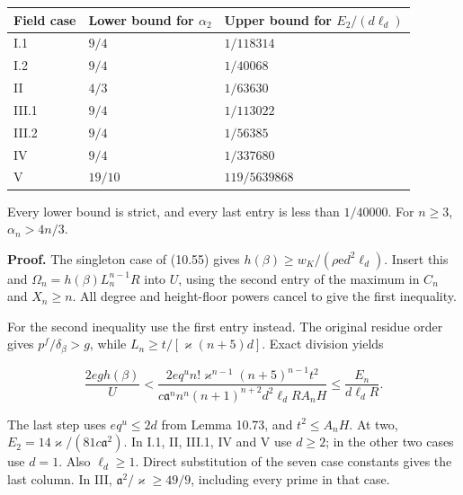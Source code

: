 \documentclass[
  11pt,
  a4paper,
]{article}
\newcounter{none} %
\begin{document}
{\def\LTcaptype{none} %
\begin{longtable}[]{@{}
  >{\raggedright\arraybackslash}p{}
  >{\raggedright\arraybackslash}p{}
  >{\raggedright\arraybackslash}p{}@{}}
\toprule\noalign{}
\begin{minipage}[b]{\linewidth}\raggedright
Field case
\end{minipage} & \begin{minipage}[b]{\linewidth}\raggedright
Lower bound for \(\alpha_2\)
\end{minipage} & \begin{minipage}[b]{\linewidth}\raggedright
Upper bound for \(E_2/(d\ell_d)\)
\end{minipage} \\
\midrule\noalign{}
\endhead
\bottomrule\noalign{}
\endlastfoot
I.1 & \(9/4\) & \(1/118314\) \\
I.2 & \(9/4\) & \(1/40068\) \\
II & \(4/3\) & \(1/63630\) \\
III.1 & \(9/4\) & \(1/113022\) \\
III.2 & \(9/4\) & \(1/56385\) \\
IV & \(9/4\) & \(1/337680\) \\
V & \(19/10\) & \(119/5639868\) \\
\end{longtable}
}

Every lower bound is strict, and every last entry is less than
\(1/40000\). For \(n\ge3\), \(\alpha_n>4n/3\).

\textbf{Proof.} The singleton case of (10.55) gives
\(h(\beta)\ge w_K/(\rho\mathrm e d^2\ell_d)\). Insert this and
\(\Omega_n=h(\beta)L_n^{n-1}R\) into \(U\), using the second entry of
the maximum in \(C_n\) and \(X_n\ge n\). All degree and height-floor
powers cancel to give the first inequality.

For the second inequality use the first entry instead. The original
residue order gives \(p^f/\delta_\beta>g\), while
\(L_n\ge t/[\varkappa(n+5)d]\). Exact division yields

\[
\frac{2eg h(\beta)}U
<\frac{2e q^u n!\varkappa^{n-1}(n+5)^{n-1}t^2}
{c\mathfrak a^n n^n(n+1)^{n+2}d^2\ell_dRA_nH}
\le\frac{E_n}{d\ell_dR}.
\tag{10.493}
\]

The last step uses \(eq^u\le2d\) from Lemma 10.73, and \(t^2\le A_nH\).
At two, \(E_2=14\varkappa/(81c\mathfrak a^2)\). In I.1, II, III.1, IV
and V use \(d\ge2\); in the other two cases use \(d=1\). Also
\(\ell_d\ge1\). Direct substitution of the seven case constants gives
the last column. In III, \(\mathfrak a^2/\varkappa\ge49/9\), including
every prime in that case.
\end{document}
